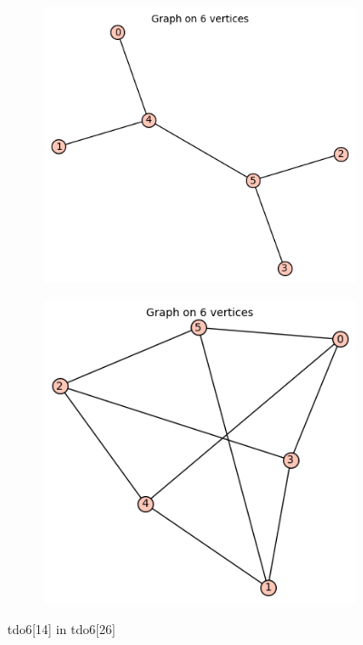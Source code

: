 \documentclass[12pt, a4paper]{article}
\begin{document}
\begin{center}
\begin{figure}[!htb]
\centering
\begin{subfigure}{0.5\textwidth}
  \centering
  \includegraphics[width=0.5\linewidth]{tdo6[14]}
\end{subfigure}%
\begin{subfigure}{0.5\textwidth}
  \centering
  \includegraphics[width=0.5\linewidth]{tdo6[26]}
\end{subfigure}
\caption{tdo6[14] in tdo6[26]}
\label{fig:test}
\end{figure}


\end{center}
\end{document}
